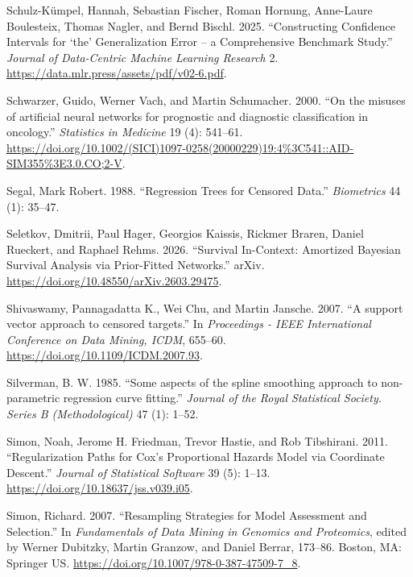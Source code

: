 \documentclass[
  letterpaper,
  krantz2]{style/krantz}
\newlength{\cslhangindent}
\newenvironment{CSLReferences}[2] %
 {\begin{list}{}{%
  \setlength{\itemindent}{0pt}
  \setlength{\leftmargin}{0pt}
  \setlength{\parsep}{0pt}
  \ifodd #1
   \setlength{\leftmargin}{\cslhangindent}
   \setlength{\itemindent}{-1\cslhangindent}
  \fi
  \setlength{\itemsep}{#2\baselineskip}}}
 {\end{list}}
\begin{document}
\begin{CSLReferences}{1}{0}
Schulz-Kümpel, Hannah, Sebastian Fischer, Roman Hornung, Anne-Laure
Boulesteix, Thomas Nagler, and Bernd Bischl. 2025. {``Constructing
Confidence Intervals for {`the'} Generalization Error -- a Comprehensive
Benchmark Study.''} \emph{Journal of Data-Centric Machine Learning
Research} 2. \url{https://data.mlr.press/assets/pdf/v02-6.pdf}.

Schwarzer, Guido, Werner Vach, and Martin Schumacher. 2000. {``{On the
misuses of artificial neural networks for prognostic and diagnostic
classification in oncology}.''} \emph{Statistics in Medicine} 19 (4):
541--61.
\url{https://doi.org/10.1002/(SICI)1097-0258(20000229)19:4\%3C541::AID-SIM355\%3E3.0.CO;2-V}.

Segal, Mark Robert. 1988. {``{Regression Trees for Censored Data}.''}
\emph{Biometrics} 44 (1): 35--47.

Seletkov, Dmitrii, Paul Hager, Georgios Kaissis, Rickmer Braren, Daniel
Rueckert, and Raphael Rehms. 2026. {``Survival {In-Context}: {Amortized
Bayesian Survival Analysis} via {Prior-Fitted Networks}.''} arXiv.
\url{https://doi.org/10.48550/arXiv.2603.29475}.

Shivaswamy, Pannagadatta K., Wei Chu, and Martin Jansche. 2007. {``{A
support vector approach to censored targets}.''} In \emph{Proceedings -
IEEE International Conference on Data Mining, ICDM}, 655--60.
\url{https://doi.org/10.1109/ICDM.2007.93}.

Silverman, B. W. 1985. {``{Some aspects of the spline smoothing approach
to non-parametric regression curve fitting}.''} \emph{Journal of the
Royal Statistical Society. Series B (Methodological)} 47 (1): 1--52.

Simon, Noah, Jerome H. Friedman, Trevor Hastie, and Rob Tibshirani.
2011. {``Regularization Paths for Cox's Proportional Hazards Model via
Coordinate Descent.''} \emph{Journal of Statistical Software} 39 (5):
1--13. \url{https://doi.org/10.18637/jss.v039.i05}.

Simon, Richard. 2007. {``Resampling Strategies for Model Assessment and
Selection.''} In \emph{Fundamentals of Data Mining in Genomics and
Proteomics}, edited by Werner Dubitzky, Martin Granzow, and Daniel
Berrar, 173--86. Boston, MA: Springer US.
\url{https://doi.org/10.1007/978-0-387-47509-7_8}.


\end{CSLReferences}
\end{document}
